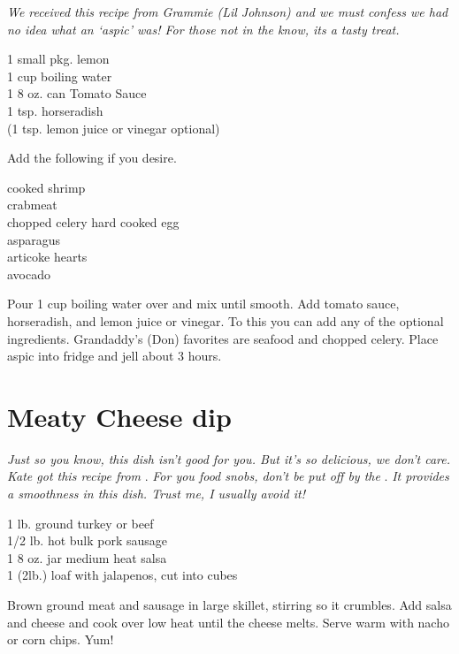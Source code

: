 \textit{We received this recipe from Grammie (Lil Johnson) and we must 
confess we had no idea what an `aspic' was!  For those not in the know,
its a tasty treat.} 
\begin{ingredients}
1 small pkg. lemon \\
1 cup boiling water \\
1 8 oz. can  Tomato Sauce \\
1 tsp. horseradish \\
(1 tsp. lemon juice or vinegar optional)  \\
\end{ingredients}
Add the following if you desire.
\begin{ingredients}
cooked shrimp \\
crabmeat \\
chopped celery
hard cooked egg \\
asparagus \\
articoke hearts \\
avocado \\
\end{ingredients}
Pour 1 cup boiling water over  and mix until smooth. Add 
tomato sauce, horseradish, and lemon juice or vinegar. 
To this you can add any of the optional ingredients. Grandaddy's (Don)
favorites are seafood and chopped celery. Place aspic into fridge 
and jell about 3 hours. 

\section{Meaty Cheese dip}

\textit{Just so you know, this dish isn't good for you. But it's so delicious,
we don't care. Kate got this recipe from} .
\textit{For you food snobs, don't be put off by the} . 
\textit{It provides a smoothness in this dish. Trust me, I usually avoid it!}
\begin{ingredients}
1 lb. ground turkey or beef\\
1/2 lb. hot bulk pork sausage\\
1 8 oz. jar medium heat salsa\\
1 (2lb.) loaf  with jalapenos, cut into cubes
\end{ingredients}
Brown ground meat and sausage in large skillet, stirring so it crumbles. Add
salsa and cheese and cook over low heat until the cheese melts. Serve warm
with nacho or corn chips. Yum!

